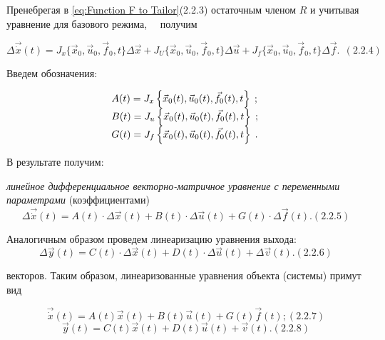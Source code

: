 \bigskip


		Пренебрегая в  \eqref{eq:Function F to Tailor}(2.2.3) остаточным членом  $R$ и учитывая уравнение для базового режима, \ \ получим



\begin{equation}\label{key}
		\Delta \vec{\dot x}(t)=J_x\{\vec x_0,\vec u_0,\vec f_0,t\}\Delta \vec x+J_U\{\vec x_0,\vec u_0,\vec f_0,t\}\Delta \vec u+J_f\{\vec
		x_0,\vec u_0,\vec f_0,t\}\Delta \vec f.\ \ (2.2.4)
\end{equation}



		Введем обозначения:


\begin{equation*}
\begin{matrix}A(t)=J_x\left\{\vec x_0(t),\vec u_0(t),\vec f_0(t),t\right\}\;;\hfill\null \\B(t)=J_u\left\{\vec
x_0(t),\vec u_0(t),\vec f_0(t),t\right\}\;;\hfill\null \\G(t)=J_f\left\{\vec x_0(t),\vec u_0(t),\vec
f_0(t),t\right\}\;.\hfill\null \end{matrix}\hfill 
\end{equation*}

		В результате получим:



		\textit{линейное дифференциальное векторно-матричное уравнение с переменными параметрами} (коэффициентами)
\begin{equation}\label{eq:Dif Mat Vec Eq}
		\Delta \vec{\dot x}(t)=A(t)\cdot \Delta \vec x(t)+B(t)\cdot \Delta \vec u(t)+G(t)\cdot \Delta \vec f(t). (2.2.5)
\end{equation}


		Аналогичным образом проведем линеаризацию уравнения вы­хо­да:
\begin{equation}\label{eq: lean eq exit}
		  \Delta \vec y(t)=C(t)\cdot \Delta \vec x(t)+D(t)\cdot \Delta \vec u(t)+\Delta \vec v(t). (2.2.6)
\end{equation}



		векторов. Таким образом, линеаризованные уравнения объекта (системы) примут вид



\begin{equation}\label{eq: lean system 1}
		\vec{\dot x}(t)=A(t)\vec x(t)+B(t)\vec u(t)+G(t)\vec f(t); (2.2.7)
\end{equation}
\begin{equation}\label{eq: lean system 2}
		\vec y(t)=C(t)\vec x(t)+D(t)\vec u(t)+\vec v(t).(2.2.8)
\end{equation}



